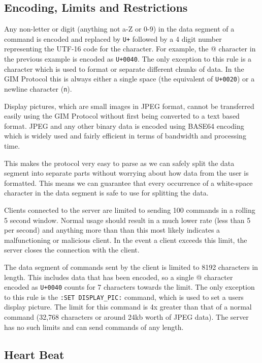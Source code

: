 \subsection{Encoding, Limits and Restrictions}
\label{encoding}

Any non-letter or digit (anything not a-Z or 0-9) in the data segment of a command is encoded and replaced by \texttt{\SLASH U+} followed by a 4 digit number representing the UTF-16 code for the character. For example, the @ character in the previous example is encoded as \texttt{\SLASH U+0040}. The only exception to this rule is a character which is used to format or separate different chunks of data. In the GIM Protocol this is always either a single space (the equivalent of \texttt{\SLASH U+0020}) or a newline character (\texttt{\SLASH n}).

Display pictures, which are small images in JPEG format, cannot be transferred easily using the GIM Protocol without first being converted to a text based format. JPEG and any other binary data is encoded using BASE64 encoding which is widely used and fairly efficient in terms of bandwidth and processing time.

This makes the protocol very easy to parse as we can safely split the data segment into separate parts without worrying about how data from the user is formatted. This means we can guarantee that every occurrence of a white-space character in the data segment is safe to use for splitting the data.

Clients connected to the server are limited to sending 100 commands in a rolling 5 second window. Normal usage should result in a much lower rate (less than 5 per second) and anything more than than this most likely indicates a malfunctioning or malicious client. In the event a client exceeds this limit, the server closes the connection with the client.

The data segment of commands sent by the client is limited to 8192 characters in length. This includes data that has been encoded, so a single @ character encoded as \texttt{\SLASH U+0040} counts for 7 characters towards the limit. The only exception to this rule is the \texttt{:SET DISPLAY\_PIC:} command, which is used to set a users display picture. The limit for this command is 4x greater than that of a normal command (32,768 characters or around 24kb worth of JPEG data). The server has no such limits and can send commands of any length.

\subsection{Heart Beat}

